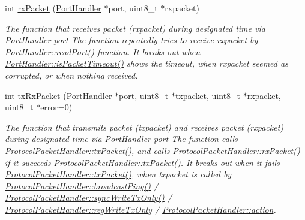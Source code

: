 \begin{DoxyCompactItemize}
int \hyperlink{classmercury_1_1_protocol_packet_handler_a4d124ca43f6a2178497eaaabb9e5907b}{rx\+Packet} (\hyperlink{classmercury_1_1_port_handler}{Port\+Handler} $\ast$port, uint8\+\_\+t $\ast$rxpacket)
\begin{DoxyCompactList}\small\item\em The function that receives packet (rxpacket) during designated time via \hyperlink{classmercury_1_1_port_handler}{Port\+Handler} port  The function repeatedly tries to receive rxpacket by \hyperlink{classmercury_1_1_port_handler_afa6f52d7b95c5ffd8f0c92477d517c79}{Port\+Handler\+::read\+Port()} function.  It breaks out  when \hyperlink{classmercury_1_1_port_handler_a6733438255ede3d34738842e10cd8fc2}{Port\+Handler\+::is\+Packet\+Timeout()} shows the timeout,  when rxpacket seemed as corrupted, or  when nothing received. \end{DoxyCompactList}\item 
int \hyperlink{classmercury_1_1_protocol_packet_handler_a68b02f23af616886d0795ea12debd613}{tx\+Rx\+Packet} (\hyperlink{classmercury_1_1_port_handler}{Port\+Handler} $\ast$port, uint8\+\_\+t $\ast$txpacket, uint8\+\_\+t $\ast$rxpacket, uint8\+\_\+t $\ast$error=0)
\begin{DoxyCompactList}\small\item\em The function that transmits packet (txpacket) and receives packet (rxpacket) during designated time via \hyperlink{classmercury_1_1_port_handler}{Port\+Handler} port  The function calls \hyperlink{classmercury_1_1_protocol_packet_handler_a245f01395d9684bc58788e8a06de3ffc}{Protocol\+Packet\+Handler\+::tx\+Packet()},  and calls \hyperlink{classmercury_1_1_protocol_packet_handler_a4d124ca43f6a2178497eaaabb9e5907b}{Protocol\+Packet\+Handler\+::rx\+Packet()} if it succeeds \hyperlink{classmercury_1_1_protocol_packet_handler_a245f01395d9684bc58788e8a06de3ffc}{Protocol\+Packet\+Handler\+::tx\+Packet()}.  It breaks out  when it fails \hyperlink{classmercury_1_1_protocol_packet_handler_a245f01395d9684bc58788e8a06de3ffc}{Protocol\+Packet\+Handler\+::tx\+Packet()},  when txpacket is called by \hyperlink{classmercury_1_1_protocol_packet_handler_a3cbeb97b8a4a955180a54255a0931d2d}{Protocol\+Packet\+Handler\+::broadcast\+Ping()} / \hyperlink{classmercury_1_1_protocol_packet_handler_a4a08a338c48d6c9ef42183ca74297dce}{Protocol\+Packet\+Handler\+::sync\+Write\+Tx\+Only()} / \hyperlink{classmercury_1_1_protocol_packet_handler_af43e9f53d3e295b12b69f4b99c8c1746}{Protocol\+Packet\+Handler\+::reg\+Write\+Tx\+Only} / \hyperlink{classmercury_1_1_protocol_packet_handler_a55034471e726b363c0a535acb1012468}{Protocol\+Packet\+Handler\+::action}. \end{DoxyCompactList}\item 

\end{DoxyCompactItemize}
